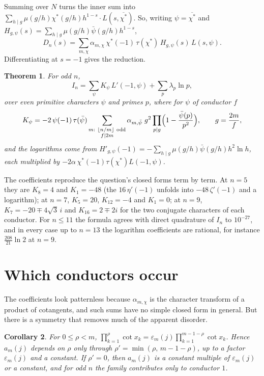 \documentclass[11pt]{article}
\newtheorem{theorem}{Theorem}
\newtheorem{corollary}[theorem]{Corollary}
\begin{document}
Summing over $N$ turns the inner sum into $\sum_{h\mid g}\mu(g/h)\chi^*(g/h)h^{1-s}\cdot L(s,\overline{\chi^*})$.
So, writing $\psi=\overline{\chi^*}$ and $H_{g,\psi}(s)=\sum_{h\mid g}\mu(g/h)\bar\psi(g/h)h^{1-s}$,
\[
D_n(s)=\sum_{m,\chi}\alpha_{m,\chi}\,\chi^*(-1)\,\tau(\chi^*)\,H_{g,\psi}(s)\,L(s,\psi).
\]
Differentiating at $s=-1$ gives the reduction.

\begin{theorem}\label{thm:coef}
For odd $n$,
\[
I_n=\sum_{\psi}K_\psi\,L'(-1,\psi)+\sum_{p}\lambda_p\ln p ,
\]
over even primitive characters $\psi$ and primes $p$, where for $\psi$ of conductor $f$
\[
K_\psi=-2\,\psi(-1)\,\tau(\bar\psi)\sum_{\substack{m:\ \lfloor n/m\rfloor\ \text{odd}\\ f\mid2m}}\alpha_{m,\bar\psi}\;g^2\prod_{p\mid g}\Bigl(1-\frac{\bar\psi(p)}{p^2}\Bigr),\qquad g=\frac{2m}{f},
\]
and the logarithms come from $H'_{g,\psi}(-1)=-\sum_{h\mid g}\mu(g/h)\bar\psi(g/h)h^2\ln h$, each multiplied by
$-2\alpha\,\chi^*(-1)\tau(\chi^*)L(-1,\psi)$.
\end{theorem}

The coefficients reproduce the question's closed forms term by term. At $n=5$ they are $K_8=4$ and $K_1=-48$ (the
$16\,\eta'(-1)$ unfolds into $-48\,\zeta'(-1)$ and a logarithm); at $n=7$, $K_5=20$, $K_{12}=-4$ and $K_1=0$; at $n=9$,
$K_7=-20\mp4\sqrt3\,i$ and $K_{16}=2\mp2i$ for the two conjugate characters of each conductor. For $n\le11$ the formula
agrees with direct quadrature of $I_n$ to $10^{-27}$, and in every case up to $n=13$ the logarithm coefficients are
rational, for instance $\tfrac{208}{21}\ln2$ at $n=9$.

\section{Which conductors occur}

The coefficients look patternless because $\alpha_{m,\chi}$ is the character transform of a product of cotangents,
and such sums have no simple closed form in general. But there is a symmetry that removes much of the apparent
disorder.

\begin{corollary}\label{cor:rho}
For $0\le\rho<m$, $\prod_{k=1}^{\rho}\cot x_k=\varepsilon_m(j)\prod_{k=1}^{m-1-\rho}\cot x_k$. Hence $a_m(j)$ depends on
$\rho$ only through $\rho'=\min(\rho,\,m-1-\rho)$, up to a factor $\varepsilon_m(j)$ and a constant. If $\rho'=0$, then
$a_m(j)$ is a constant multiple of $\varepsilon_m(j)$ or a constant, and for odd $n$ the family contributes only to
conductor $1$.
\end{corollary}
\end{document}
